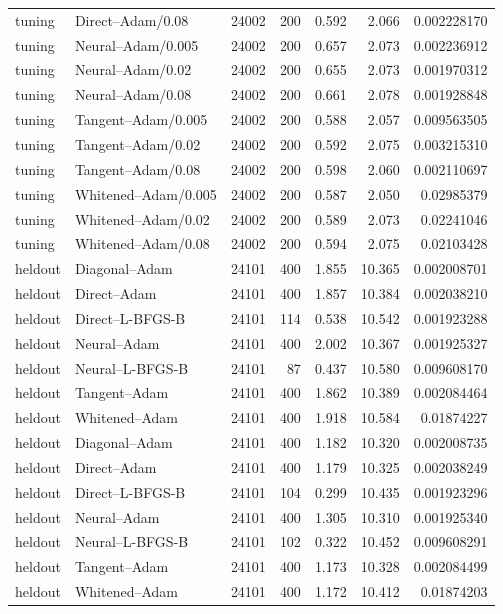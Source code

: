 \begin{longtable}{llrrrrr}
tuning & Direct--Adam/0.08 & 24002 & 200 & 0.592 & 2.066 & 0.002228170\\
tuning & Neural--Adam/0.005 & 24002 & 200 & 0.657 & 2.073 & 0.002236912\\
tuning & Neural--Adam/0.02 & 24002 & 200 & 0.655 & 2.073 & 0.001970312\\
tuning & Neural--Adam/0.08 & 24002 & 200 & 0.661 & 2.078 & 0.001928848\\
tuning & Tangent--Adam/0.005 & 24002 & 200 & 0.588 & 2.057 & 0.009563505\\
tuning & Tangent--Adam/0.02 & 24002 & 200 & 0.592 & 2.075 & 0.003215310\\
tuning & Tangent--Adam/0.08 & 24002 & 200 & 0.598 & 2.060 & 0.002110697\\
tuning & Whitened--Adam/0.005 & 24002 & 200 & 0.587 & 2.050 & 0.02985379\\
tuning & Whitened--Adam/0.02 & 24002 & 200 & 0.589 & 2.073 & 0.02241046\\
tuning & Whitened--Adam/0.08 & 24002 & 200 & 0.594 & 2.075 & 0.02103428\\
heldout & Diagonal--Adam & 24101 & 400 & 1.855 & 10.365 & 0.002008701\\
heldout & Direct--Adam & 24101 & 400 & 1.857 & 10.384 & 0.002038210\\
heldout & Direct--L-BFGS-B & 24101 & 114 & 0.538 & 10.542 & 0.001923288\\
heldout & Neural--Adam & 24101 & 400 & 2.002 & 10.367 & 0.001925327\\
heldout & Neural--L-BFGS-B & 24101 & 87 & 0.437 & 10.580 & 0.009608170\\
heldout & Tangent--Adam & 24101 & 400 & 1.862 & 10.389 & 0.002084464\\
heldout & Whitened--Adam & 24101 & 400 & 1.918 & 10.584 & 0.01874227\\
heldout & Diagonal--Adam & 24101 & 400 & 1.182 & 10.320 & 0.002008735\\
heldout & Direct--Adam & 24101 & 400 & 1.179 & 10.325 & 0.002038249\\
heldout & Direct--L-BFGS-B & 24101 & 104 & 0.299 & 10.435 & 0.001923296\\
heldout & Neural--Adam & 24101 & 400 & 1.305 & 10.310 & 0.001925340\\
heldout & Neural--L-BFGS-B & 24101 & 102 & 0.322 & 10.452 & 0.009608291\\
heldout & Tangent--Adam & 24101 & 400 & 1.173 & 10.328 & 0.002084499\\
heldout & Whitened--Adam & 24101 & 400 & 1.172 & 10.412 & 0.01874203\\

\end{longtable}
